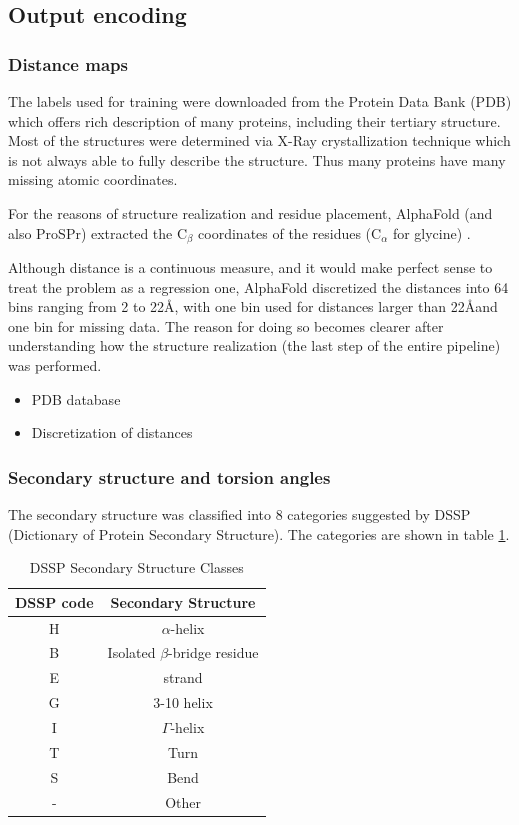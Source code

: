 \subsection{Output encoding}
        
\subsubsection{Distance maps}
The labels used for training were downloaded from the Protein Data Bank (PDB) which offers rich description of many proteins, including their tertiary structure. 
Most of the structures were determined via X-Ray crystallization technique which is not always able to fully describe the structure. 
Thus many proteins have many missing atomic coordinates. 
        
For the reasons of structure realization and residue placement, AlphaFold (and also ProSPr) extracted the C$_\beta$ coordinates of the residues (C$_\alpha$ for glycine) \cite{alphafold}.
        
Although distance is a continuous measure, and it would make perfect sense to treat the problem as a regression one, AlphaFold discretized the distances into 64 bins ranging from 2 to 22\AA, with one bin used for distances larger than 22\AA and one bin for missing data. 
The reason for doing so becomes clearer after understanding how the structure realization (the last step of the entire pipeline) was performed.
    
\begin{itemize}
    \item PDB database
    \item Discretization of distances
\end{itemize}
        
\subsubsection{Secondary structure and torsion angles}
        
The secondary structure was classified into 8 categories suggested by DSSP (Dictionary of Protein Secondary Structure). 
The categories are shown in table \ref{tab:dssp}.
        
\begin{table}[ht]
    \centering
    \begin{tabular}{c|c}
        DSSP code & Secondary Structure\\ 
        \hline
        H     & $\alpha$-helix \\
        B     & Isolated $\beta$-bridge residue \\
        E     & strand \\
        G     & 3-10 helix \\
        I     & $\Gamma$-helix \\
        T     & Turn \\
        S     & Bend \\
        -     & Other 
    \end{tabular}
    \caption{DSSP Secondary Structure Classes}
    \label{tab:dssp}
\end{table}
        
